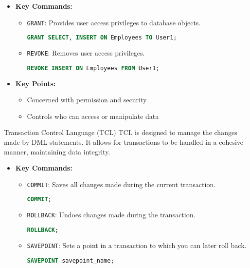 \documentclass[aspectratio=169]{beamer}
\begin{document}
\begin{frame}[fragile]
    \begin{itemize}
        \item \textbf{Key Commands:}
        \begin{itemize}
            \item \texttt{GRANT}: Provides user access privileges to database objects.
            \begin{lstlisting}[language=SQL]
GRANT SELECT, INSERT ON Employees TO User1;
            \end{lstlisting}
            \item \texttt{REVOKE}: Removes user access privileges.
            \begin{lstlisting}[language=SQL]
REVOKE INSERT ON Employees FROM User1;
            \end{lstlisting}
        \end{itemize}
        
        \item \textbf{Key Points:}
        \begin{itemize}
            \item Concerned with permission and security
            \item Controls who can access or manipulate data
        \end{itemize}
    \end{itemize}
    
    \begin{block}{Transaction Control Language (TCL)}
        TCL is designed to manage the changes made by DML statements. 
        It allows for transactions to be handled in a cohesive manner, maintaining data integrity.
    \end{block}
    
    \begin{itemize}
        \item \textbf{Key Commands:}
        \begin{itemize}
            \item \texttt{COMMIT}: Saves all changes made during the current transaction.
            \begin{lstlisting}[language=SQL]
COMMIT;
            \end{lstlisting}
            \item \texttt{ROLLBACK}: Undoes changes made during the transaction.
            \begin{lstlisting}[language=SQL]
ROLLBACK;
            \end{lstlisting}
            \item \texttt{SAVEPOINT}: Sets a point in a transaction to which you can later roll back.
            \begin{lstlisting}[language=SQL]
SAVEPOINT savepoint_name;
            \end{lstlisting}
        \end{itemize}
        

\end{itemize}
\end{frame}
\end{document}
